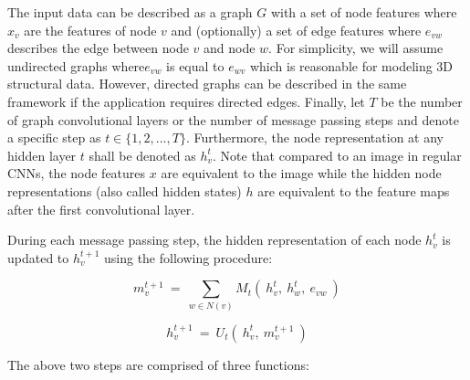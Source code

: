 The input data can be described as a graph $G$ with	a set of node features where $x_v$ are the features of node $v$ and (optionally) a set of edge features where $e_{vw}$ describes the edge between node $v$ and node $w$. For simplicity, we will assume undirected graphs where$e_{vw}$ is equal to $e_{wv}$ which is reasonable for modeling 3D structural data. However, directed graphs can be described in the same framework if the application requires directed edges. Finally, let $T$ be the number of graph convolutional layers or the number of message passing steps and denote a specific step as $t \in \{1, 2, ..., T\}$. Furthermore, the node representation at any hidden layer $t$ shall be denoted as $h_v^t$. Note that compared to an image in regular CNNs, the node features $x$ are equivalent to the image while the hidden node representations (also called hidden states) $h$ are equivalent to the feature maps after the first convolutional layer.

During each message passing step, the hidden representation of each node $h_v^t$ is updated to $h_v^{t+1}$ using the following procedure:

\begin{equation}\label{eq:message-function}
m_v^{t+1} ~=~ \sum_{w \in N(v)} M_t(~h_v^t,~ h_w^t,~ e_{vw}~)
\end{equation}

\begin{equation}\label{eq:update-function}
h_v^{t+1} ~=~ U_t(~h_v^t, ~m_v^{t+1}~)
\end{equation}


The above two steps are comprised of three functions:

